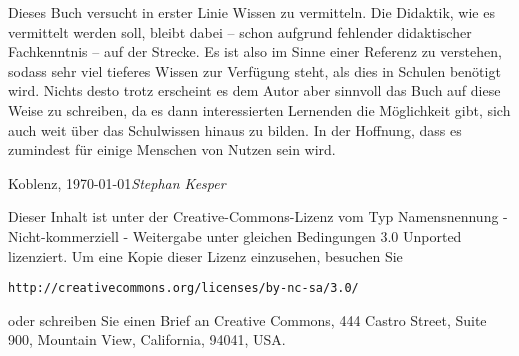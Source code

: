 Dieses Buch versucht in erster Linie Wissen zu vermitteln. Die Didaktik, wie es vermittelt werden soll, bleibt dabei -- schon aufgrund fehlender didaktischer Fachkenntnis -- auf der Strecke. Es ist also im Sinne einer Referenz zu verstehen, sodass sehr viel tieferes Wissen zur Verfügung steht, als dies in Schulen benötigt wird. Nichts desto trotz erscheint es dem Autor aber sinnvoll das Buch auf diese Weise zu schreiben, da es dann interessierten Lernenden die Möglichkeit gibt, sich auch weit über das Schulwissen hinaus zu bilden. In der Hoffnung, dass es zumindest für einige Menschen von Nutzen sein wird.


\vspace{\baselineskip}
\begin{flushright}\noindent
Koblenz, \today \hfill \textit{Stephan Kesper}
\end{flushright}

\vfill

\noindent Dieser Inhalt ist unter der Creative-Commons-Lizenz vom Typ Namensnennung - Nicht-kommerziell - Weitergabe unter gleichen Bedingungen 3.0 Unported lizenziert. Um eine Kopie dieser Lizenz einzusehen, besuchen Sie

\bigskip
\begin{center}
\texttt{http://creativecommons.org/licenses/by-nc-sa/3.0/}
\end{center}

\bigskip

\noindent oder schreiben Sie einen Brief an Creative Commons, 444 Castro Street, Suite 900, Mountain View, California, 94041, USA.


